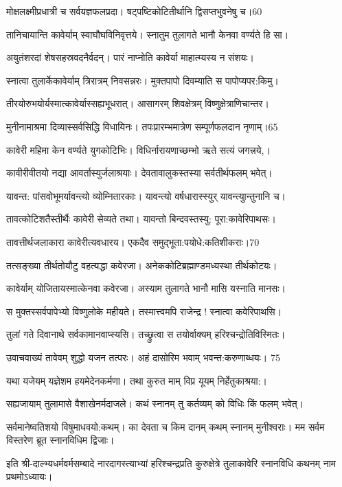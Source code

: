 मोक्षलक्ष्मीप्रधात्री च सर्वयज्ञफलप्रदा।
षट्पष्टिकोटितीर्थानि द्विसप्तभुवनेषु च।60

तानिचायान्ति कावेर्याम् स्वाघौघविनिवृत्तये।
स्नातुम तुलागते भानौ केनवा वर्ण्यते हि सा।

अयुतंशरदां शेषसहस्रवदनैर्वदन्।
पारं नाप्नोति कावेर्या माहात्म्यस्य न संशयः।

स्नात्वा तुलार्केकावेर्याम् त्रिरात्रम् निवसन्नरः।
मुक्तपापो दिवम्याति स पापोप्यपर:किमु।

तीरयोरुभयोर्यस्मात्कावेर्यास्सह्यभूधरात्।
आसागरम् शिवक्षेत्रम् विष्णुक्षेत्राणिचान्तर।

मुनीनामाश्रमा दिव्यास्सर्वसिद्धि विधायिनः।
तपःप्रारम्भमात्रेण सम्पूर्णफलदान नृणाम्।65

कावेरी महिमा केन वर्ण्यते युगकोटिभिः।
विधिर्नारायणाच्छम्भो ऋते सत्यं जगत्त्रये,।

कावीरीवीतयो नद्या आवर्तास्युर्जलाश्रयाः।
देवतावालुकस्तस्या सर्वतीर्थफलम् भवेत्।

यावन्त: पांसवोभूमर्यावन्त्यो व्योम्नितारकाः।
यावन्त्यो वर्षधारास्स्युर् यावन्त्युान्तुनानि च।

तावत्कोटिशतैस्तीर्थैः कावेरी सेव्यते तथा।
यावन्तो बिन्दवस्तस्यु: पूरा:कावेरिपाथसः।

तावत्तीर्थजलाकारा कावेरीत्यवधारय।
एकदैव समुद्भूता:पयोधे:कतिशीकराः।70

तत्सङ्ख्या तीर्थतोयौटु वहत्यद्धा कवेरजा।
अनेककोटिब्रह्माण्डमध्यस्था तीर्थकोटयः।

कावेर्याम् योजितायस्मात्केनवा कवेरजा।
अस्याम तुलागते भानौ मासि यस्नाति मानसः।

स मुक्तस्सर्वपापेभ्यो विष्णुलोके महीयते।
तस्मात्त्वमपि राजेन्द्र ! स्नात्वा कवेरिपाथसि।

तुलां गते दिवानाथे सर्वकामानवाप्स्यसि।
तच्छ्रुत्वा स तयोर्वाक्यम् हरिश्चन्द्रोतिविस्मितः।

उवाचवाख्यं तावेवम् शुद्धो यजन तत्परः।
अहं दासोरिम भवाम् भवन्त:करुणाब्धयः। 75

यथा यजेयम् यज्ञेशम हयमेदेनकर्मणा।
तथा कुरुत माम् विप्र यूयम् निर्हेतुकाश्रया:।

सह्यजायाम् तुलामासे वैशाखेनर्मदाजले।
कथं स्नानम् तु कर्तव्यम् को विधिः किं फलम् भवेत्।

सर्वमानेष्वतिशयो विषुमाधवयो:कथम्।
का देवता च किम दानम् कथम् स्नानम् मुनीश्वराः।
मम सर्वम विस्तरेण ब्रूत स्नानविधिम द्विजाः।

इति श्री-दाल्भ्यधर्मवर्मसम्बादे नारदागस्त्याभ्यां हरिश्चन्द्रप्रति कुरुक्षेत्रे तुलाकावेरि स्नानविधि कथनम् नाम प्रथमोऽध्यायः।



